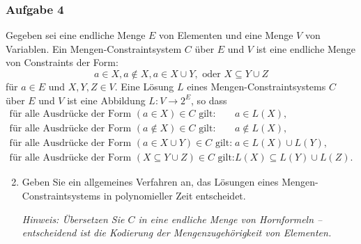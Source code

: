 \documentclass{beamer}
\begin{document}
	\begin{frame} \frametitle{Aufgabe 4}
		\footnotesize \justifying
		Gegeben sei eine endliche Menge $E$ von Elementen und eine Menge $V$ von Variablen. Ein
		Mengen-Constraintsystem $C$ über $E$ und $V$ ist eine endliche Menge von Constraints der Form:
		\begin{equation*}
			a \in X, a \notin X, a \in X \cup Y, \text{ oder } X \subseteq Y \cup Z
		\end{equation*}
		für $a \in E$ und $X, Y, Z \in V$. Eine Lösung $L$ eines Mengen-Constraintsystems $C$ über $E$ und $V$
		ist eine Abbildung $L : V \to 2^E$, so dass
		\begin{align*}
			\text{für alle Ausdrücke der Form } (a \in X) \in C \text{ gilt}: \quad &a \in L(X), \\
			\text{für alle Ausdrücke der Form } (a \notin X) \in C \text{ gilt}: \quad &a \notin L(X), \\
			\text{für alle Ausdrücke der Form } (a \in X \cup Y ) \in C \text{ gilt}: \quad &a \in L(X) \cup L(Y ), \\
			\text{für alle Ausdrücke der Form } (X \subseteq Y \cup Z) \in C \text{ gilt}: \quad &L(X) \subseteq L(Y ) \cup L(Z).
		\end{align*}
		
		\begin{enumerate}[\bfseries a)]
			\setcounter{enumi}{1}
			\item Geben Sie ein allgemeines Verfahren an, das Lösungen eines Mengen-Constraintsystems
			in polynomieller Zeit entscheidet.
			
			\itshape Hinweis: Übersetzen Sie $C$ in eine endliche Menge von Hornformeln – entscheidend ist die
			Kodierung der Mengenzugehörigkeit von Elementen.

		\end{enumerate}
	\end{frame}
\end{document}
